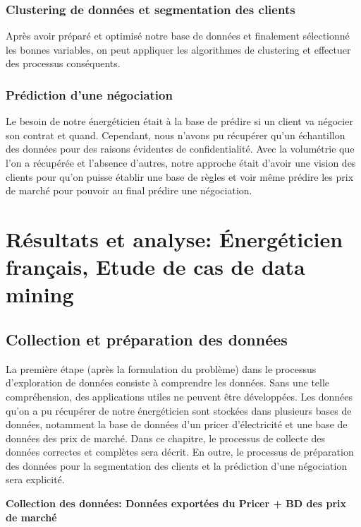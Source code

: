 \documentclass[12pt]{article}
\begin{document}
{%

\subsubsection{Clustering de données et segmentation des clients}

Après avoir préparé et optimisé notre base de données et finalement sélectionné les bonnes variables, on peut appliquer les algorithmes de clustering et effectuer des processus conséquents.


\subsubsection{Prédiction d’une négociation}

Le besoin de notre énergéticien était à la base de prédire si un client va négocier son contrat et quand. Cependant, nous n’avons pu récupérer qu’un échantillon des données pour des raisons évidentes de confidentialité. Avec la volumétrie que l’on a récupérée et l’absence d’autres, notre approche était d’avoir une vision des clients pour qu’on puisse établir une base de règles et voir même prédire les prix de marché pour pouvoir au final prédire une négociation.

 
\section{Résultats et analyse: Énergéticien français, Etude de cas de data mining }
\subsection{Collection et préparation des données}

La première étape (après la formulation du problème) dans le processus d'exploration de données consiste à comprendre les données. Sans une telle compréhension, des applications utiles ne peuvent être développées. 
Les données qu’on a pu récupérer de notre énergéticien sont stockées dans plusieurs bases de données, notamment la base de données d’un pricer d’électricité et une base de données des prix de marché. 
Dans ce chapitre, le processus de collecte des données correctes et complètes sera décrit. 
En outre, le processus de préparation des données pour la segmentation des clients et la prédiction d’une négociation sera explicité.


{\bf Collection des données: Données exportées du Pricer + BD des prix de marché}

}
\end{document}
